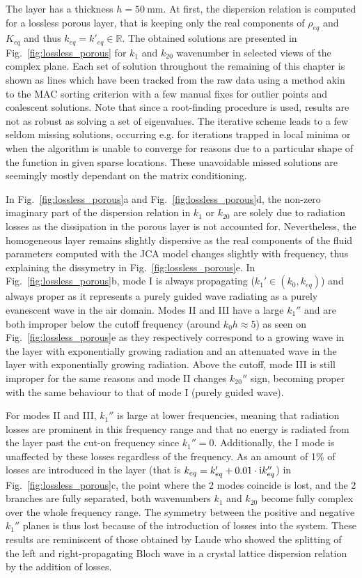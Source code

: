 The layer has a thickness $h = 50~\mathrm{mm}$. At first, the dispersion relation is computed for a lossless porous layer, that is keeping only the real components of $\rho_{eq}$ and $K_{eq}$ and thus $k_{eq} = k'_{eq} \in \mathbb R$. The obtained solutions are presented in Fig.~\ref{fig:lossless_porous} for $k_1$ and $k_{20}$ wavenumber in selected views of the complex plane. Each set of solution throughout the remaining of this chapter is shown as lines which have been tracked from the raw data using a method akin to the MAC sorting criterion \cite{vacher2010, pastor2012} with a few manual fixes for outlier points and coalescent solutions. Note that since a root-finding procedure is used, results are not as robust as solving a set of eigenvalues. The iterative scheme leads to a few seldom missing solutions, occurring e.g. for iterations trapped in local minima or when the algorithm is unable to converge for reasons due to a particular shape of the function in given sparse locations. These unavoidable missed solutions are seemingly mostly dependant on the matrix conditioning.

In Fig.~\ref{fig:lossless_porous}a and Fig.~\ref{fig:lossless_porous}d, the non-zero imaginary part of the dispersion relation in $k_1$ or $k_{20}$ are solely due to radiation losses as the dissipation in the porous layer is not accounted for. Nevertheless, the homogeneous layer remains slightly dispersive as the real components of the fluid parameters computed with the JCA model changes slightly with frequency, thus explaining the dissymetry in Fig.~\ref{fig:lossless_porous}e. In Fig.~\ref{fig:lossless_porous}b, mode I is always propagating ($k_1' \in (k_0, k_{eq})$) and always proper as it represents a purely guided wave radiating as a purely evanescent wave in the air domain. Modes II and III have a large $k_1''$ and are both improper below the cutoff frequency (around $k_0 h \approx 5$) as seen on Fig.~\ref{fig:lossless_porous}e as they respectively correspond to a growing wave in the layer with exponentially growing radiation and an attenuated wave in the layer with exponentially growing radiation. Above the cutoff, mode III is still improper for the same reasons and mode II changes $k_{20}''$ sign, becoming proper with the same behaviour to that of mode I (purely guided wave). 

For modes II and III, $k_1''$ is large at lower frequencies, meaning that radiation losses are prominent in this frequency range and that no energy is radiated from the layer past the cut-on frequency since $k_1'' = 0$. Additionally, the I mode is unaffected by these losses regardless of the frequency. As an amount of 1\% of losses are introduced in the layer (that is $k_{eq} = k'_{eq} + 0.01\cdot \mathrm i  k''_{eq}$) in Fig.~\ref{fig:lossless_porous}c, the point where the 2 modes coincide is lost, and the 2 branches are fully separated, both wavenumbers $k_1$ and $k_{20}$ become fully complex over the whole frequency range. The symmetry between the positive and negative $k_1''$ planes is thus lost because of the introduction of losses into the system. These results are reminiscent of those obtained by Laude \etal \cite{laude2013} who showed the splitting of the left and right-propagating Bloch wave in a crystal lattice dispersion relation by the addition of losses.


